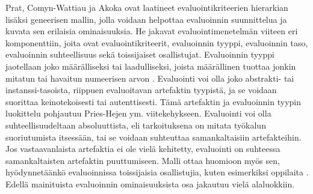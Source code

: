 \documentclass[utf8]{gradu3}
\begin{document}
Prat, Comyn-Wattiau ja Akoka \parencite*{evaluation} ovat laatineet evaluointikriteerien hierarkian lisäksi geneerisen mallin, jolla voidaan helpottaa evaluoinnin suunnittelua ja kuvata sen erilaisia ominaisuuksia. He jakavat evaluointimenetelmän viiteen eri komponenttiin, joita ovat evaluointikriteerit, evaluoinnin tyyppi, evaluoinnin taso, evaluoinnin suhteellisuus sekä toissijaiset osallistujat. Evaluoinnin tyyppi jaotellaan joko määrälliseksi tai laadulliseksi, joista määrällinen tuottaa jonkin mitatun tai havaitun numeerisen arvon \parencite{evaluation}. Evaluointi voi olla joko abstrakti- tai instanssi-tasoista, riippuen evaluoitavan artefaktin tyypistä, ja se voidaan suorittaa keinotekoisesti tai autenttisesti. Tämä artefaktin ja evaluoinnin tyypin luokittelu pohjautuu Pries-Hejen ym. \parencite*{pries} viitekehykseen. Evaluointi voi olla suhteellisuudeltaan absoluuttista, eli tarkoituksena on mitata työkalun suoriutumista itsessään, tai se voidaan suhteuttaa samankaltaisiin artefakteihin. Jos vastaavanlaista artefaktia ei ole vielä kehitetty, evaluointi on suhteessa samankaltaisten artefaktin puuttumiseen. Malli ottaa huomioon myös sen, hyödynnetäänkö evaluoinnissa toissijaisia osallistujia, kuten esimerkiksi oppilaita \parencite{evaluation}. Edellä mainituista evaluoinnin ominaisuuksista osa jakautuu vielä alaluokkiin.
\end{document}
